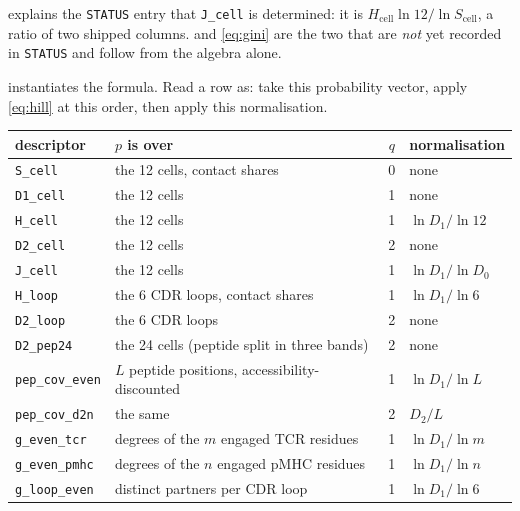 \documentclass[11pt,a4paper]{article}
\newcommand{\dsc}[1]{\texttt{#1}}
\begin{document}
 explains the \texttt{STATUS} entry that \dsc{J\_cell} is determined: it is
$H_{\mathrm{cell}} \ln 12 / \ln S_{\mathrm{cell}}$, a ratio of two shipped columns.  and
\cref{eq:gini} are the two that are \emph{not} yet recorded in \texttt{STATUS} and follow from the
algebra alone.

 instantiates the formula. Read a row as: take this probability vector, apply
\cref{eq:hill} at this order, then apply this normalisation.

\begin{table}[t]
\centering\small
\begin{tabular}{@{}llcl@{}}
\toprule
descriptor & $p$ is over & $q$ & normalisation \\
\midrule
\dsc{S\_cell}            & the 12 cells, contact shares                    & 0 & none \\
\dsc{D1\_cell}           & the 12 cells                                    & 1 & none \\
\dsc{H\_cell}            & the 12 cells                                    & 1 & $\ln D_1 / \ln 12$ \\
\dsc{D2\_cell}           & the 12 cells                                    & 2 & none \\
\dsc{J\_cell}            & the 12 cells                                    & 1 & $\ln D_1 / \ln D_0$ \\
\addlinespace
\dsc{H\_loop}            & the 6 CDR loops, contact shares                 & 1 & $\ln D_1 / \ln 6$ \\
\dsc{D2\_loop}           & the 6 CDR loops                                 & 2 & none \\
\dsc{D2\_pep24}          & the 24 cells (peptide split in three bands)     & 2 & none \\
\addlinespace
\dsc{pep\_cov\_even}     & $L$ peptide positions, accessibility-discounted & 1 & $\ln D_1 / \ln L$ \\
\dsc{pep\_cov\_d2n}      & the same                                        & 2 & $D_2 / L$ \\
\addlinespace
\dsc{g\_even\_tcr}       & degrees of the $m$ engaged TCR residues         & 1 & $\ln D_1 / \ln m$ \\
\dsc{g\_even\_pmhc}      & degrees of the $n$ engaged pMHC residues        & 1 & $\ln D_1 / \ln n$ \\
\dsc{g\_loop\_even}      & distinct partners per CDR loop                  & 1 & $\ln D_1 / \ln 6$ \\

\end{tabular}
\end{table}
\end{document}
